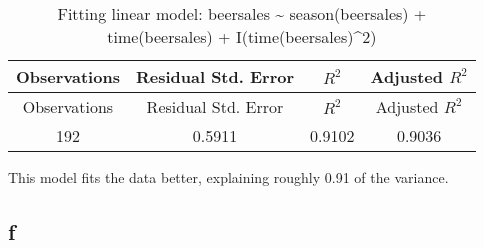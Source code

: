 \documentclass[]{book}
\theoremstyle{definition}
\theoremstyle{definition}
\theoremstyle{remark}
\begin{document}
\begin{longtable}[c]{@{}cccc@{}}
\caption{Fitting linear model: beersales \textasciitilde{}
season(beersales) + time(beersales) +
I(time(beersales)\^{}2)}\tabularnewline
\toprule
\begin{minipage}[b]{0.18\columnwidth}\centering\strut
Observations
\strut\end{minipage} &
\begin{minipage}[b]{0.27\columnwidth}\centering\strut
Residual Std. Error
\strut\end{minipage} &
\begin{minipage}[b]{0.10\columnwidth}\centering\strut
\(R^2\)
\strut\end{minipage} &
\begin{minipage}[b]{0.20\columnwidth}\centering\strut
Adjusted \(R^2\)
\strut\end{minipage}\tabularnewline
\midrule
\endfirsthead
\toprule
\begin{minipage}[b]{0.18\columnwidth}\centering\strut
Observations
\strut\end{minipage} &
\begin{minipage}[b]{0.27\columnwidth}\centering\strut
Residual Std. Error
\strut\end{minipage} &
\begin{minipage}[b]{0.10\columnwidth}\centering\strut
\(R^2\)
\strut\end{minipage} &
\begin{minipage}[b]{0.20\columnwidth}\centering\strut
Adjusted \(R^2\)
\strut\end{minipage}\tabularnewline
\midrule
\endhead
\begin{minipage}[t]{0.18\columnwidth}\centering\strut
192
\strut\end{minipage} &
\begin{minipage}[t]{0.27\columnwidth}\centering\strut
0.5911
\strut\end{minipage} &
\begin{minipage}[t]{0.10\columnwidth}\centering\strut
0.9102
\strut\end{minipage} &
\begin{minipage}[t]{0.20\columnwidth}\centering\strut
0.9036
\strut\end{minipage}\tabularnewline
\bottomrule
\end{longtable}

This model fits the data better, explaining roughly 0.91 of the
variance.

\subsection*{f}\label{f}
\end{document}
